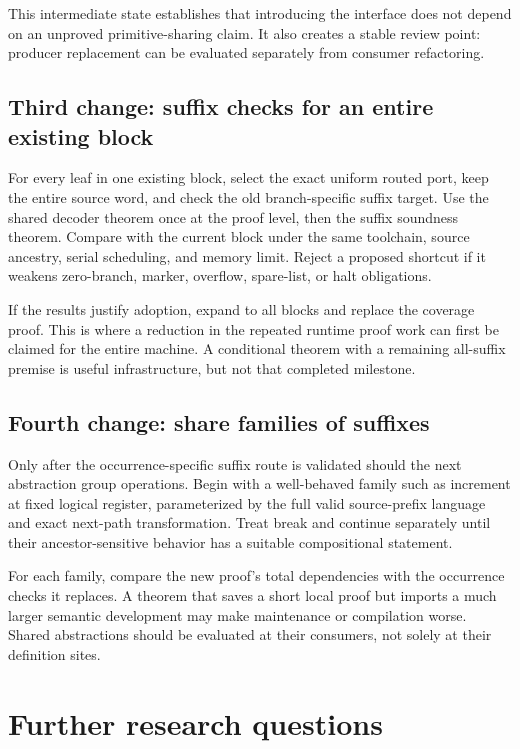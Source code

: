 \documentclass[11pt,letterpaper]{article}
\theoremstyle{definition}\newtheorem{definition}[theorem]{Definition}
\theoremstyle{remark}\newtheorem{remark}[theorem]{Remark}
\begin{document}
This intermediate state establishes that introducing the interface does not depend on an unproved primitive-sharing claim. It also creates a stable review point: producer replacement can be evaluated separately from consumer refactoring.

\subsection{Third change: suffix checks for an entire existing block}

For every leaf in one existing block, select the exact uniform routed port, keep the entire source word, and check the old branch-specific suffix target. Use the shared decoder theorem once at the proof level, then the suffix soundness theorem. Compare with the current block under the same toolchain, source ancestry, serial scheduling, and memory limit. Reject a proposed shortcut if it weakens zero-branch, marker, overflow, spare-list, or halt obligations.

If the results justify adoption, expand to all blocks and replace the coverage proof. This is where a reduction in the repeated runtime proof work can first be claimed for the entire machine. A conditional theorem with a remaining all-suffix premise is useful infrastructure, but not that completed milestone.

\subsection{Fourth change: share families of suffixes}

Only after the occurrence-specific suffix route is validated should the next abstraction group operations. Begin with a well-behaved family such as increment at fixed logical register, parameterized by the full valid source-prefix language and exact next-path transformation. Treat break and continue separately until their ancestor-sensitive behavior has a suitable compositional statement.

For each family, compare the new proof's total dependencies with the occurrence checks it replaces. A theorem that saves a short local proof but imports a much larger semantic development may make maintenance or compilation worse. Shared abstractions should be evaluated at their consumers, not solely at their definition sites.

\section{Further research questions}
\end{document}
